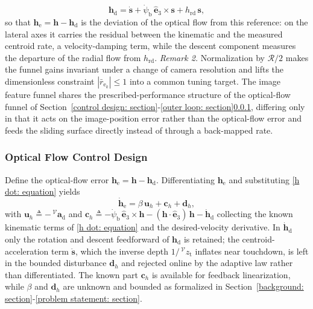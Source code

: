 \documentclass{IEEEtaes}
\begin{document}
\begin{equation} \label{h_d final: equation}
    \boldsymbol{h}_\text{d} = \dot{\boldsymbol{s}} + \dot{\psi}_\text{b}\,\hat{\boldsymbol{e}}_3\times\boldsymbol{s} + h_\text{rd}\,\boldsymbol{s},
\end{equation}
so that $\boldsymbol{h}_\text{e}=\boldsymbol{h}-\boldsymbol{h}_\text{d}$ is the deviation of the optical flow from this reference: on the lateral axes it carries the residual between the kinematic and the measured centroid rate, a velocity-damping term, while the descent component measures the departure of the radial flow from $h_\text{rd}$.
\textit{Remark 2.} Normalization by $\mathcal{R}/2$ makes the funnel gains invariant under a change of camera resolution and lifts the dimensionless constraint $|\bar{r}_{\text{e}_k}|\le 1$ into a common tuning target. The image feature funnel shares the prescribed-performance structure of the optical-flow funnel of Section~\ref{control design: section}-\ref{outer loop: section}\ref{optic flow control: section}, differing only in that it acts on the image-position error rather than the optical-flow error and feeds the sliding surface directly instead of through a back-mapped rate.

\subsubsection{Optical Flow Control Design} \label{optic flow control: section}
Define the optical-flow error $\boldsymbol{h}_\text{e}=\boldsymbol{h}-\boldsymbol{h}_\text{d}$. Differentiating $\boldsymbol{h}_\text{e}$ and substituting \eqref{h dot: equation} yields
\begin{equation} \label{h_e_dot_1: equation}
    \dot{\boldsymbol{h}}_\text{e} = \beta\,\boldsymbol{u}_h + \boldsymbol{c}_h + \boldsymbol{d}_h,
\end{equation}
with $\boldsymbol{u}_h \triangleq -\,^\mathcal{V}\boldsymbol{a}_\text{d}$ and $\boldsymbol{c}_h \triangleq -\dot{\psi}_\text{b}\,\hat{\boldsymbol{e}}_3\times\boldsymbol{h} - (\boldsymbol{h}\cdot\hat{\boldsymbol{e}}_3)\,\boldsymbol{h} - \dot{\boldsymbol{h}}_\text{d}$ collecting the known kinematic terms of \eqref{h dot: equation} and the desired-velocity derivative. In $\dot{\boldsymbol{h}}_\text{d}$ only the rotation and descent feedforward of $\boldsymbol{h}_\text{d}$ is retained; the centroid-acceleration term $\ddot{\boldsymbol{s}}$, which the inverse depth $1/\,^\mathcal{V}z_\text{t}$ inflates near touchdown, is left in the bounded disturbance $\boldsymbol{d}_h$ and rejected online by the adaptive law rather than differentiated. The known part $\boldsymbol{c}_h$ is available for feedback linearization, while $\beta$ and $\boldsymbol{d}_h$ are unknown and bounded as formalized in Section~\ref{background: section}-\ref{problem statement: section}.
\end{document}
